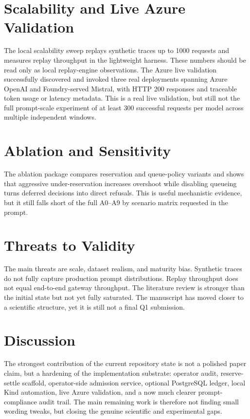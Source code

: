 \documentclass[10pt,journal,compsoc]{IEEEtran}
\begin{document}
\section{Scalability and Live Azure Validation}
The local scalability sweep replays synthetic traces up to 1000 requests and
measures replay throughput in the lightweight harness. These numbers should be
read only as local replay-engine observations. The Azure live validation
successfully discovered and invoked three real deployments spanning Azure
OpenAI and Foundry-served Mistral, with HTTP 200 responses and traceable token
usage or latency metadata. This is a real live validation, but still not the
full prompt-scale experiment of at least 300 successful requests per model
across multiple independent windows.

\section{Ablation and Sensitivity}
The ablation package compares reservation and queue-policy variants and shows
that aggressive under-reservation increases overshoot while disabling queueing
turns deferred decisions into direct refusals. This is useful mechanistic
evidence, but it still falls short of the full A0--A9 by scenario matrix
requested in the prompt.

\section{Threats to Validity}
The main threats are scale, dataset realism, and maturity bias. Synthetic
traces do not fully capture production prompt distributions. Replay throughput
does not equal end-to-end gateway throughput. The literature review is stronger
than the initial state but not yet fully saturated. The manuscript has moved
closer to a scientific structure, yet it is still not a final Q1 submission.

\section{Discussion}
The strongest contribution of the current repository state is not a polished
paper claim, but a hardening of the implementation substrate: operator audit,
reserve-settle scaffold, operator-side admission service, optional PostgreSQL
ledger, local Kind automation, live Azure validation, and a now much clearer
prompt-compliance audit trail. The main remaining work is therefore not finding
small wording tweaks, but closing the genuine scientific and experimental gaps.
\end{document}
